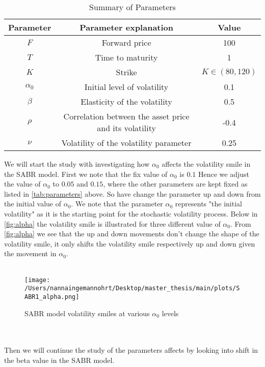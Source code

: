 \begin{table}[htbp]
    \centering
    \begin{tabular}{ccc}
      \toprule
      \textbf{Parameter} & \textbf{Parameter explanation} & \textbf{Value} \\
      \midrule
      $F$ & Forward price & 100 \\
      $T$ & Time to maturity & 1 \\
      $K$ & Strike & $K \in (80,120)$ \\
      $\alpha_0$ & Initial level of volatility & 0.1 \\
      $\beta$ & Elasticity of the volatility & 0.5 \\
      $\rho$ & Correlation between the asset price and its volatility & -0.4 \\
      $\nu$ & Volatility of the volatility parameter & 0.25 \\
      \bottomrule
    \end{tabular}
    \caption{Summary of Parameters}
    \label{tab:parameters}
\end{table}
\noindent
We will start the study with investigating how $\alpha_0$ affects the volatility smile in the SABR model. 
First we note that the fix value of $\alpha_0$ is $0.1$ Hence we adjust the value of $\alpha_0$ to $0.05$ and $0.15$,
where the other parameters are kept fixed as listed in \autoref{tab:parameters} above. So have change the parameter
up and down from the initial value of $\alpha_0$.
We note that the parameter $\alpha_0$
represents "the initial volatility" as it is the starting point for the stochastic volatility process. 
Below in \autoref{fig:alpha} the volatility smile is illustrated for three different value of $\alpha_0$. 
From \autoref{fig:alpha} we see that the up and down movements don't change the shape of the volatility smile, 
it only shifts the volatility smile respectively up and down given the movement in $\alpha_0$.
\\\\
\begin{figure}[htbp]
    \centering
    \texttt{[image: /Users/nannaingemannohrt/Desktop/master\_thesis/main/plots/SABR1\_alpha.png]}
    \caption{SABR model volatility smiles at various $\alpha_0$ levels}
    \label{fig:alpha}
\end{figure}
\\\\
\noindent
Then we will continue the study of the parameters affects by looking into shift in the beta value in the SABR model.
